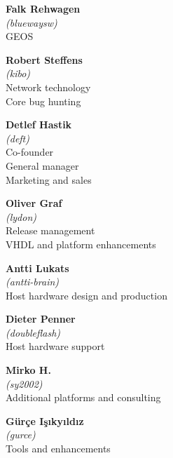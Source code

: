 \begin{mega65thanks}
\begin{minipage}{\linewidth}
    {\large\bf Falk Rehwagen} \\
    \textit{(bluewaysw)} \\
    GEOS
\end{minipage}

\begin{minipage}{\linewidth}
    {\large\bf Robert Steffens} \\
    \textit{(kibo)} \\
    Network technology \\
    Core bug hunting
\end{minipage}

\begin{minipage}{\linewidth}
    {\large\bf Detlef Hastik} \\
    \textit{(deft)} \\
    Co-founder \\
    General manager \\
    Marketing and sales
\end{minipage}

\begin{minipage}{\linewidth}
    {\large\bf Oliver Graf} \\
    \textit{(lydon)} \\
    Release management \\
    VHDL and platform enhancements
\end{minipage}

\begin{minipage}{\linewidth}
    {\large\bf Antti Lukats} \\
    \textit{(antti-brain)} \\
    Host hardware design and production
\end{minipage}

\begin{minipage}{\linewidth}
    {\large\bf Dieter Penner} \\
    \textit{(doubleflash)} \\
    Host hardware support
\end{minipage}

\begin{minipage}{\linewidth}
    {\large\bf Mirko H.} \\
    \textit{(sy2002)} \\
    Additional platforms and consulting
\end{minipage}

\begin{minipage}{\linewidth}
    {\large\bf Gürçe Işıkyıldız} \\
    \textit{(gurce)} \\
    Tools and enhancements
\end{minipage}


\end{mega65thanks}
